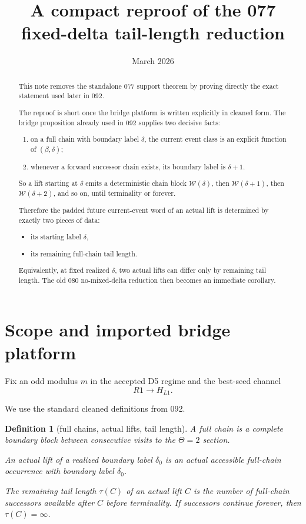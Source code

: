 \documentclass[11pt]{article}
\title{A compact reproof of the 077 fixed-delta tail-length reduction}
\author{}
\date{March 2026}
\newtheorem{definition}[theorem]{Definition}
\newcommand{\Word}{\mathcal W}
\newcommand{\tauv}{\tau}
\begin{document}
\maketitle

\begin{abstract}
This note removes the standalone 077 support theorem by proving directly the
exact statement used later in 092.

The reproof is short once the bridge platform is written explicitly in cleaned
form. The bridge proposition already used in 092 supplies two decisive facts:
\begin{enumerate}[label=\textup{(\arabic*)},leftmargin=2.5em]
\item on a full chain with boundary label $\delta$, the current event class is
      an explicit function of $(\beta,\delta)$;
\item whenever a forward successor chain exists, its boundary label is
      $\delta+1$.
\end{enumerate}
So a lift starting at $\delta$ emits a deterministic chain block
$\Word(\delta)$, then $\Word(\delta+1)$, then $\Word(\delta+2)$, and so on,
until terminality or forever.

Therefore the padded future current-event word of an actual lift is determined
by exactly two pieces of data:
\begin{itemize}[leftmargin=2em]
\item its starting label $\delta$,
\item its remaining full-chain tail length.
\end{itemize}
Equivalently, at fixed realized $\delta$, two actual lifts can differ only by
remaining tail length. The old 080 no-mixed-delta reduction then becomes an
immediate corollary.
\end{abstract}

\section{Scope and imported bridge platform}

Fix an odd modulus $m$ in the accepted D5 regime and the best-seed channel
\[
R1 \to H_{L1}.
\]

We use the standard cleaned definitions from 092.

\begin{definition}[full chains, actual lifts, tail length]
A \emph{full chain} is a complete boundary block between consecutive visits to
the $\Theta=2$ section.

An \emph{actual lift} of a realized boundary label $\delta_0$ is an actual
accessible full-chain occurrence with boundary label $\delta_0$.

The \emph{remaining tail length} $\tauv(C)$ of an actual lift $C$ is the number
of full-chain successors available after $C$ before terminality. If successors
continue forever, then $\tauv(C)=\infty$.
\end{definition}
\end{document}
